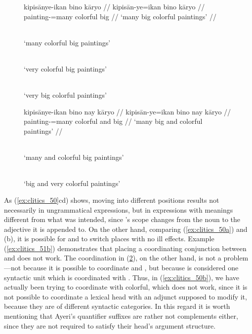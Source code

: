 \begin{figure}[h]
\pex\label{ex:clitics_50}
\a\label{ex:clitics_50a}\begingl
	\gla kipisānye-ikan bino kāryo //
	\glb kipisān-ye=ikan bino kāryo //
	\glc painting-\Pl{}=many colorful big //
	\glft `many big colorful paintings' //
\endgl

\a\label{ex:clitics_50b}  \\
	`many colorful big paintings'

\a\label{ex:clitics_50c} \ljudge{\excl}  \\
	\hphantom{\excl}`very colorful big paintings'

\a\label{ex:clitics_50d} \ljudge{\excl}  \\
	\hphantom{\excl}`very big colorful paintings'
\xe
\end{figure}

\begin{figure}[h]
\pex\label{ex:clitics_51}
\a\label{ex:clitics_51a}\begingl
	\gla kipisānye-ikan bino nay kāryo //
	\glb kipisān-ye=ikan bino nay kāryo //
	\glc painting-\Pl{}=many colorful and big //
	\glft `many big and colorful paintings' //
\endgl

\a\label{ex:clitics_51b} \ljudge{*}  \\
	\hphantom{*}`many and colorful big paintings'

\a\label{ex:clitics_51c} \ljudge{\excl}  \\
	\hphantom{\excl}`big and very colorful paintings'
\xe
\end{figure}

As (\ref{ex:clitics_50}cd) shows, moving 
into different positions results not necessarily in ungrammatical expressions,
but in expressions with meanings different from what was intended, since
's scope changes from the noun to the adjective it is
appended to. On the other hand, comparing (\ref{ex:clitics_50a}) and (b), it is
possible for  and  to
switch places with no ill effects. Example (\ref{ex:clitics_51b}) demonstrates
that placing a coordinating conjunction between  and
 does not work. The coordination in (\ref{ex:clitics_51c}), on
the other hand, is not a problem---not because it is possible to coordinate
 and , but because
 is considered one syntactic unit
which is coordinated with . Thus, in
(\ref{ex:clitics_50b}), we have actually been trying to coordinate
 with 
{colorful}, which does not work, since it is not possible to coordinate a
lexical head with an adjunct supposed to modify it, because they are of
different syntactic categories. In this regard it is worth mentioning that
Ayeri's quantifier suffixes are rather not complements either, since they are
not required to satisfy their head's argument structure.


